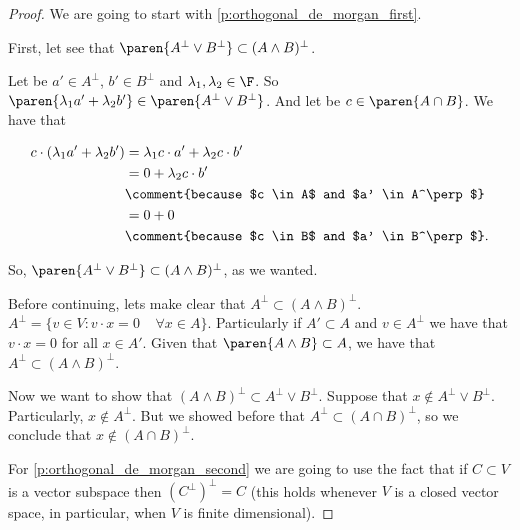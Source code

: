 \begin{proof}
    We are going to start with \eqref{p:orthogonal_de_morgan_first}.\pn
    
    First, let see that $\paren{A^\perp \vee B^\perp} \subset (A \wedge B)^\perp$.\pn
    
    Let be $a' \in A^\perp$, $b' \in B^\perp$ and $\lambda_1,\lambda_2 \in \F$. So $\paren{\lambda_1 a' + \lambda_2 b'} \in \paren{A^\perp \vee B^\perp}$. 
    And let be $c \in \paren{A \cap B}$. We have that\pn
    
    \begin{align}
            c \cdot (\lambda_1 a' + \lambda_2 b')   &=  \lambda_1 c \cdot a' + \lambda_2 c \cdot b'     \\
                                                    &=  0   +   \lambda_2 c \cdot b'                    \\
                                                    &\comment{because $c \in A$ and $a' \in A^\perp$}   \\
                                                    &=  0   +   0                                       \\
                                                    &\comment{because $c \in B$ and $a' \in B^\perp$}.   \\
    \end{align}\pn
    
    So, $\paren{A^\perp \vee B^\perp} \subset (A \wedge B)^\perp$, as we wanted.\pn
    
    Before continuing, lets make clear that $A^\perp \subset (A \wedge B)^\perp$. $A^\perp = \{ v \in V : v \cdot x = 0 \;\;\;\; \forall x \in A \}$. 
    Particularly if $A' \subset A$ and $v \in A^\perp$ we have that $v \cdot x = 0$ for all $x \in A'$. Given that $\paren{A \wedge B} \subset A$, 
    we have that $A^\perp \subset (A \wedge B)^\perp$.\pn
        
    Now we want to show that $(A \wedge B)^\perp \subset A^\perp \vee B^\perp$. Suppose that $x \notin A^\perp \vee B^\perp$. Particularly, 
    $x \notin A^\perp$. But we showed before that $A^\perp \subset (A \cap B)^\perp$, so we conclude that $x \notin (A \cap B)^\perp$.\pn
    
    For \eqref{p:orthogonal_de_morgan_second} we are going to use the fact that if $C \subset V$ is a vector subspace then
    $(C^\perp)^\perp = C$ (this holds whenever $V$ is a closed vector space, in particular, when $V$ is finite dimensional).
    

\end{proof}
